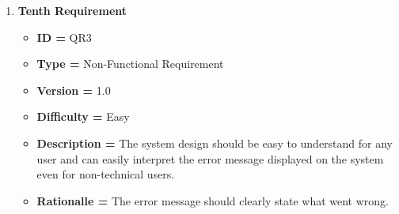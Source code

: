 \documentclass[a4paper, 12pt]{article}
\begin{document}
\begin{enumerate}[noitemsep]
        \item \textbf{Tenth Requirement}
        \begin{itemize}
            \item \textbf{ID = } QR3
            \item \textbf{Type = } Non-Functional Requirement
            \item \textbf{Version = } 1.0
            \item \textbf{Difficulty = } Easy
            \item \textbf{Description = } The system design should be easy to understand for any user and can easily interpret the error message displayed on the system even for non-technical users.
            \item \textbf{Rationalle = } The error message should clearly state what went wrong.
        \end{itemize}
    \end{enumerate}
\end{document}

